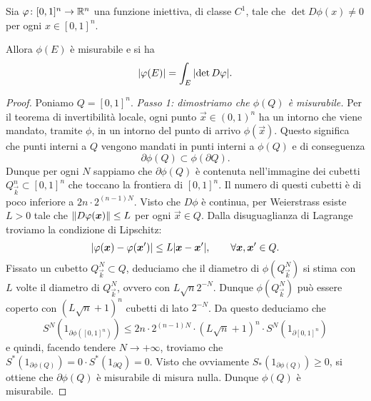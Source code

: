 \begin{theorem}
Sia $\varphi\colon [0,1]^n \to {\mathbb R}^n$
una funzione iniettiva, di classe $C^1$, tale che $\det D\phi(x)\neq 0$ per ogni $x\in [0,1]^n$.

Allora $\phi(E)$ è misurabile e si ha
\begin{equation}\label{eq:area}
 {\left|\varphi(E)\right|} = \int_E {\left|\det D\varphi\right|}.
\end{equation}
\end{theorem}
%
\begin{proof}
Poniamo $Q=[0,1]^n$.
\emph{Passo 1: dimostriamo che $\phi(Q)$ è misurabile.}
Per il teorema di invertibilità locale, ogni punto $\vec x \in (0,1)^n$
ha un intorno che viene mandato, tramite $\phi$, in un intorno del punto di arrivo $\phi(\vec x)$.
Questo significa che punti interni a $Q$ vengono mandati in punti interni a $\phi(Q)$
e di conseguenza 
\[
  \partial \phi(Q) \subset \phi(\partial Q).
\]
Dunque per ogni $N$ sappiamo che $\partial \phi(Q)$ è contenuta nell'immagine 
dei cubetti $Q^n_{\vec k}\subset [0,1]^n$ che toccano la frontiera di $[0,1]^n$.
Il numero di questi cubetti è di poco inferiore a $2n\cdot 2^{(n-1)N}$.
Visto che $D\phi$ è continua, per Weierstrass esiste $L>0$ tale che ${\left\Vert D\varphi(\boldsymbol x)\right\Vert} \le L$ per ogni $\vec x\in Q$.
Dalla disuguaglianza di Lagrange troviamo la condizione di Lipschitz:
\[
{\left|\varphi(\boldsymbol x) - \varphi(\boldsymbol x')\right|} \le L {\left|\boldsymbol x - \boldsymbol x'\right|}, \qquad \forall \boldsymbol x,\boldsymbol x' \in Q.
\]
Fissato un cubetto $Q^N_{\vec k}\subset Q$, 
deduciamo che il diametro di $\phi(Q^N_{\vec k})$ si stima con $L$ volte il diametro di $Q^N_{\vec k}$,
ovvero con $L \sqrt n 2^{-N}$.
Dunque $\phi(Q^N_{\vec k})$ può essere coperto con $(L\sqrt n +1)^n$ cubetti di lato $2^{-N}$.
Da questo deduciamo che 
\[
  S^N(1_{\partial \phi([0,1]^n)}) \le 2n\cdot 2^{(n-1)N}\cdot (L\sqrt n + 1)^n \cdot S^N(1_{\partial [0,1]^n})
\]
e quindi, facendo tendere $N\to +\infty$, troviamo che 
$S^*(1_{\partial \phi(Q)}) = 0 \cdot S^*(1_{\partial Q})=0$.
Visto che ovviamente $S_*(1_{\partial \phi(Q)}) \ge 0$, 
si ottiene che $\partial \phi(Q)$ è misurabile 
di misura nulla. Dunque $\phi(Q)$ è misurabile.


\end{proof}
